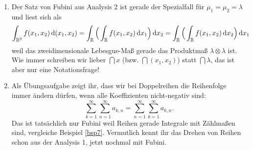 \begin{beispiel}\label{lab}  \abs

	\begin{enumerate}[label=(\roman*)]
		\item Der Satz von Fubini aus Analysis 2 ist gerade der Spezialfall f\"ur $\mu_1=\mu_2=\lambda$ und liest sich als
		\begin{align*}
			\int_{\mathbb{R}^2} f(x_1,x_2) \, \mathrm{d}(x_1,x_2)=\int_{\mathbb{R}} \Big(\int_{\mathbb{R}} f(x_1,x_2) \, \mathrm{d} x_1 \Big)\, \mathrm{d} x_2=\int_{\mathbb{R}} \Big(\int_{\mathbb{R}} f(x_1,x_2) \, \mathrm{d} x_2 \Big)\, \mathrm{d} x_1
		\end{align*}
		weil das zweidimensionale Lebesgue-Ma\ss{} gerade das Produktma\ss{} $\lambda\otimes \lambda$ ist. Wie immer schreiben wir lieber $\dint x$ (bzw. $\dint (x_1,x_2)$) statt $\dint \lambda$, das ist aber nur eine Notationsfrage!
		\item
			Als \"Ubungsaufgabe zeigt ihr, dass wir bei Doppelreihen die Reihenfolge immer \"andern d\"urfen, wenn alle Koeffizienten nicht-negativ sind:
		 \[ \sum\limits_{k = 1}^{\infty} \sum\limits_{n = 1}^{\infty} a_{k,n} = \sum\limits_{n = 1}^{\infty} \sum\limits_{k = 1}^{\infty} a_{k,n}. \] 
		 Das ist tats\"achlich nur Fubini weil Reihen gerade Integrale mit Z\"ahlma\ss en sind, vergleiche Beispiel \ref{bsp7}. Vermutlich kennt ihr das Drehen von Reihen schon aus der Analysis 1, jetzt nochmal mit Fubini.
		
			\end{enumerate}
\end{beispiel}

